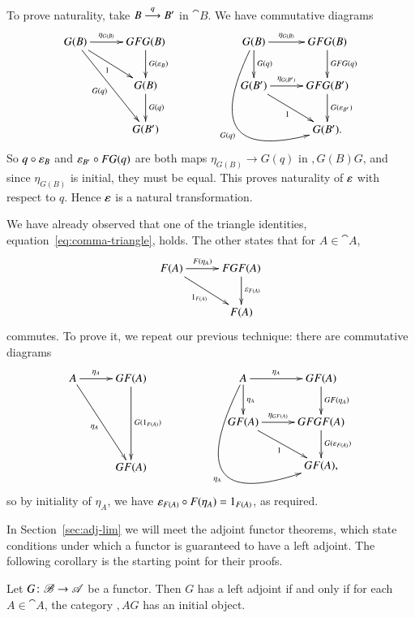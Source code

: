 \begin{pf}
To prove naturality, take $B \stackrel{q}{\longrightarrow} B'$ in $\cat{B}$.  We have commutative
diagrams 
\[
\xymatrix@C+1ex{
G(B) \ar[r]^-{\eta_{G(B)}} \ar[rd]_1 \ar[rdd]_{G(q)}     &
GFG(B) \ar[d]^{G(\epsln_B)}     \\
        &G(B) \ar[d]^{G(q)}     \\
        &G(B')
}
% 
\qquad\qquad
% 
\xymatrix@C+1ex{
G(B) \ar[r]^-{\eta_{G(B)}} \ar[d]^{G(q)} 
\ar@/^-5pc/[rdd]_{G(q)}  &
GFG(B) \ar[d]^{GFG(q)}  \\
G(B') \ar[r]^-{\eta_{G(B')}} \ar[rd]_1   &
GFG(B') \ar[d]^{G(\epsln_{B'})} \\
        &
G(B').
}
\]
So $q \mathbin{\circ} \varepsilon_B$ and $\varepsilon_{B'} \mathbin{\circ} FG(q)$ are both maps $\eta_{G(B)} \to
G(q)$ in $\comma{G(B)}{G}$, and since $\eta_{G(B)}$ is initial, they must be
equal.  This proves naturality of $\varepsilon$ with respect to $q$.  Hence
$\varepsilon$ is a natural transformation.

We have already observed that one of the triangle identities,
equation~\eqref{eq:comma-triangle}, holds.  The other states that for $A \in
\cat{A}$,
\[
\xymatrix@C+1ex{
F(A) \ar[r]^-{F(\eta_A)} \ar[rd]_{1_{F(A)}}      &
FGF(A) \ar[d]^{\epsln_{F(A)}}   \\
        &
F(A)
}
\]
commutes.  To prove it, we repeat our previous technique: there are
commutative diagrams
\[
\xymatrix@R+.5em@C+1ex{
A \ar[r]^-{\eta_A} \ar[rdd]_{\eta_A}     &
GF(A) \ar[dd]^{G(1_{F(A)})}     \\
        &       \\
        &GF(A)
}
% 
\qquad\qquad
% 
\xymatrix@C+1ex{
A \ar[r]^-{\eta_A} \ar[d]^{\eta_A}       
\ar@/^-5.7pc/[rdd]_{\eta_A}  &
GF(A) \ar[d]^{GF(\eta_A)}       \\
GF(A) \ar[r]^-{\eta_{GF(A)}} \ar[rd]_1   &
GFGF(A) \ar[d]^{G(\epsln_{F(A)})}       \\
        &
GF(A),
}
\]
so by initiality of $\eta_A$, we have $\varepsilon_{F(A)} \mathbin{\circ} F(\eta_A) =
1_{F(A)}$, as required.
\end{pf}

In Section~\ref{sec:adj-lim} we will meet the adjoint functor theorems,
which state conditions under which a functor is guaranteed to have a left
adjoint.  The following corollary is the starting point for their proofs.

\begin{cor}
\label{cor:pre-AFT}
Let $G\from \cat{B} \to \cat{A}$ be a functor.  Then $G$ has a left adjoint if
and only if for each $A \in \cat{A}$, the category $\comma{A}{G}$ has an
initial object.
\end{cor}

